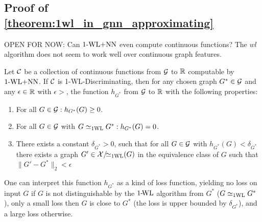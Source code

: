 \newpage
\subsection{Proof of \cref{theorem:1wl_in_gnn_approximating}}
OPEN FOR NOW: Can $\text{1-WL+NN}$ even compute continuous functions? The $wl$ algorithm does not seem to work well over continuous graph features.

\begin{lemma}
    Let $\mathcal{C}$ be a collection of continuous functions from $\mathcal{G}$ to $\mathbb{R}$ computable by $\text{1-WL+NN}$. If $\mathcal{C}$ is 1-\!WL-Discriminating, then for any chosen graph $G^* \in \mathcal{G}$ and any $\epsilon \in \mathbb{R}$ with $\epsilon > $, the function $h_{G^*}$ from $\mathcal{G}$ to $\mathbb{R}$ with the following properties:
    \begin{enumerate}
        \item For all $G \in \mathcal{G}:  h_{G^*}(G) \geq 0$.
        \item For all $G \in \mathcal{G}$ with $G \simeq_{\text{1WL}} G^*: h_{G^*}(G)=0$.
        \item There exists a constant $\delta_{G^*} > 0$, such that for all $G \in \mathcal{G}$ with $h_{G^*}(G) < \delta_{G^*}$ there exists a graph $G' \in \mathcal{X}/\!{\simeq_{\text{1WL}}}(G)$ in the equivalence class of $G$ such that $\| G' - G^* \|_2 < \epsilon$
    \end{enumerate}
\end{lemma}

One can interpret this function $h_{G^*}$ as a kind of loss function, yielding no loss on input $G$ if $G$ is not distinguishable by the $\text{1-\!WL}$ algorithm from $G^*$ ($G \simeq_{\text{1WL}} G^*$), only a small loss then $G$ is close to $G^*$ (the loss is upper bounded by $\delta_{G^*}$), and a large loss otherwise.

